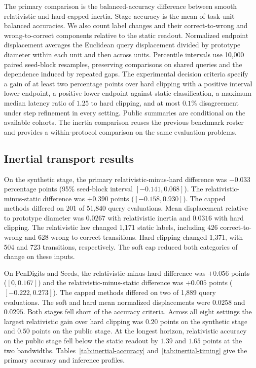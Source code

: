 The primary comparison is the balanced-accuracy difference between smooth
relativistic and hard-capped inertia. Stage accuracy is the mean of
task-unit balanced accuracies. We also count label changes and their
correct-to-wrong and wrong-to-correct components relative to the static
readout. Normalized endpoint displacement averages the Euclidean query
displacement divided by prototype diameter within each unit and then
across units. Percentile intervals use 10,000 paired seed-block resamples,
preserving comparisons on shared queries and the dependence induced by
repeated gaps. The experimental decision criteria specify a gain of at
least two percentage points over hard clipping with a positive interval
lower endpoint, a positive lower endpoint against static classification,
a maximum median latency ratio of $1.25$ to hard clipping, and at most
$0.1\%$ disagreement under step refinement in every setting. Public
summaries are conditional on the available cohorts. The inertia comparison
reuses the previous benchmark roster and provides a within-protocol
comparison on the same evaluation problems.

\subsection{Inertial transport results}

On the synthetic stage, the primary relativistic-minus-hard difference was
$-0.033$ percentage points (95\% seed-block interval $[-0.141,0.068]$).
The relativistic-minus-static difference was $+0.390$ points
($[-0.158,0.930]$). The capped methods differed on 201 of 51,840 query
evaluations. Mean displacement relative to prototype diameter was $0.0267$
with relativistic inertia and $0.0316$ with hard clipping. The relativistic
law changed 1,171 static labels, including 426 correct-to-wrong and 628
wrong-to-correct transitions. Hard clipping changed 1,371, with 504 and
723 transitions, respectively. The soft cap reduced both categories of
change on these inputs.

On PenDigits and Seeds, the relativistic-minus-hard difference was
$+0.056$ points ($[0,0.167]$) and the relativistic-minus-static difference
was $+0.005$ points ($[-0.222,0.273]$). The capped methods differed on two
of 1,889 query evaluations. The soft and hard mean normalized displacements
were $0.0258$ and $0.0295$. Both stages fell short of the accuracy criteria.
Across all eight settings the largest relativistic gain over hard clipping
was $0.20$ points on the synthetic stage and $0.50$ points on the public
stage. At the longest horizon, relativistic accuracy on the public stage
fell below the static readout by $1.39$ and $1.65$ points at the two bandwidths.
Tables~\ref{tab:inertial-accuracy} and~\ref{tab:inertial-timing} give the
primary accuracy and inference profiles.

